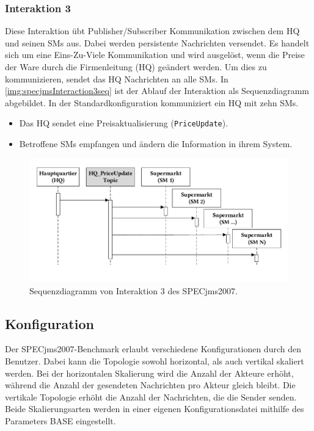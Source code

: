 \subsubsection{Interaktion 3}
\label{sec:interaction3desc}
Diese Interaktion übt Publisher/Subscriber Kommunikation zwischen dem HQ und seinen SMs aus. Dabei werden persistente Nachrichten versendet. Es handelt sich um eine Eins-Zu-Viele Kommunikation und wird ausgelöst, wenn die Preise der Ware durch die Firmenleitung (HQ) geändert werden. Um dies zu kommunizieren, sendet das HQ Nachrichten an alle SMs. In \autoref{img:specjmsInteraction3seq} ist der Ablauf der Interaktion als Sequenzdiagramm abgebildet. In der Standardkonfiguration kommuniziert ein HQ mit zehn SMs.
\begin{itemize}
    \item Das HQ sendet eine Preisaktualisierung (\texttt{PriceUpdate}).
    \item Betroffene SMs empfangen und ändern die Information in ihrem System.
\end{itemize}


\begin{figure}
\center
  \includegraphics[width=1\textwidth]{images/evaluation/specjms/evaluationInteraktion3seq.pdf}
  \caption{Sequenzdiagramm von Interaktion 3 des SPECjms2007.}
  \label{img:specjmsInteraction3seq}
\end{figure}


\subsection{Konfiguration}
Der SPECjms2007-Benchmark erlaubt verschiedene Konfigurationen durch den Benutzer. Dabei kann die Topologie sowohl horizontal, als auch vertikal skaliert werden. Bei der horizontalen Skalierung wird die Anzahl der Akteure erhöht, während die Anzahl der gesendeten Nachrichten pro Akteur gleich bleibt. Die vertikale Topologie erhöht die Anzahl der Nachrichten, die die Sender senden. Beide Skalierungsarten werden in einer eigenen Konfigurationsdatei mithilfe des Parameters BASE eingestellt.

